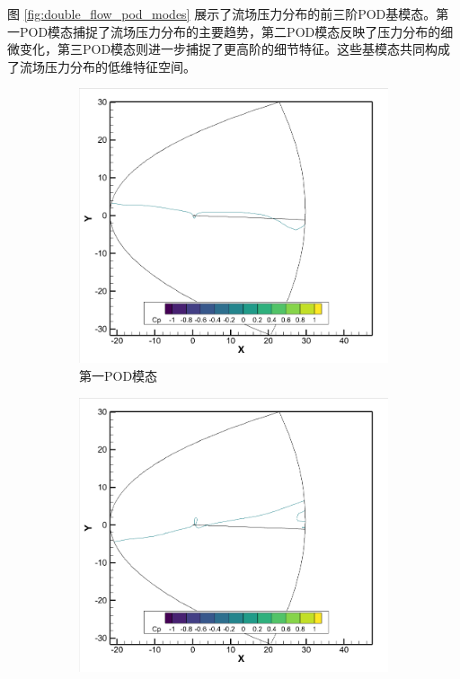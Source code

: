 图 \ref{fig:double_flow_pod_modes} 展示了流场压力分布的前三阶POD基模态。第一POD模态捕捉了流场压力分布的主要趋势，第二POD模态反映了压力分布的细微变化，第三POD模态则进一步捕捉了更高阶的细节特征。这些基模态共同构成了流场压力分布的低维特征空间。

\begin{figure}[H]
    \centering
    \begin{subfigure}[b]{0.32\textwidth}
        \includegraphics[width=\textwidth]{image/基压力分布图/双变量流场压力基1.png}
        \caption{第一POD模态}
    \end{subfigure}
    \begin{subfigure}[b]{0.32\textwidth}
        \includegraphics[width=\textwidth]{image/基压力分布图/双变量流场压力基2.png}

\end{subfigure}
\end{figure}
